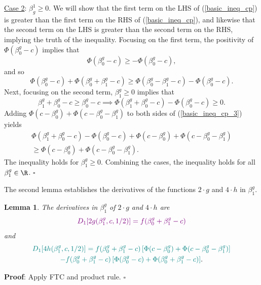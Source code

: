 \documentclass[12pt]{article}
\newtheorem{lemma}{Lemma}
\begin{document}
\begin{appendices}
\noindent
\underline{Case 2}: $\beta^1_g \geq 0.$  We will show that the first term on the LHS of (\ref{basic_ineq_cp}) is greater than the first term on the RHS of (\ref{basic_ineq_cp}), and likewise that the second term on the LHS is greater than the second term on the RHS, implying the truth of the inequality. Focusing on the first term, the positivity of $\Phi(\beta^g_0 -c)$ implies that
$$ \Phi(\beta^g_0 - c) \geq - \Phi(\beta^g_0 - c),$$ and so
$$ \Phi(\beta^g_0 - c) + \Phi(\beta^g_0 + \beta^g_1 - c) \geq \Phi(\beta^g_0 - \beta^g_1 - c) - \Phi(\beta^g_0 - c).$$
Next, focusing on the second term, $\beta^g_1 \geq 0$ implies that 
\begin{equation}\label{basic_ineq_cp_3}
\beta^g_1 + \beta^g_0 - c \geq \beta^g_0 - c \implies \Phi(\beta^g_1 + \beta^g_0 - c) - \Phi(\beta^g_0 - c) \geq 0.
\end{equation}
Adding $\Phi(c - \beta^g_0) + \Phi(c - \beta^g_0 - \beta^g_1)$ to both sides of (\ref{basic_ineq_cp_3}) yields
\begin{multline*}
\Phi(\beta^g_1 + \beta^g_0 - c) - \Phi(\beta^g_0 - c) + \Phi(c - \beta^g_0) + \Phi(c - \beta^g_0 - \beta^g_1) \\ \geq \Phi(c - \beta^g_0) + \Phi(c - \beta^g_0 - \beta^g_1). \textrm{ }
\end{multline*}
The inequality holds for $\beta^g_1 \geq 0$. Combining the cases, the inequality holds for all $\beta^g_1 \in \R$. $\square$

The second lemma establishes the derivatives of the functions $2\cdot g$ and $4 \cdot h$ in $\beta^g_1$.
\begin{lemma}
The derivatives in $\beta^g_1$ of $2\cdot g$ and $4\cdot h$ are
\begin{equation}\label{dg_dbeta}
\textcolor{violet}{D_1[2g(\beta^g_1, c, 1/2)] = f(\beta^g_0 + \beta^g_1 - c)}
\end{equation}
and
\begin{multline}\label{dh_dbeta}
\textcolor{teal}{D_1[4h(\beta^g_1, c, 1/2)] = f(\beta^g_0 + \beta^g_1 - c) \left[\Phi(c - \beta^g_0) + \Phi(c - \beta_0^g - \beta_1^g) \right]} \\ \textcolor{teal}{- f(\beta^g_0 + \beta^g_1 - c) \left[\Phi(\beta_0^g - c) + \Phi(\beta^g_0 + \beta^g_1 - c) \right]}.\end{multline}
\end{lemma}
\textbf{Proof}: Apply FTC and product rule. $\square$


\end{appendices}
\end{document}
